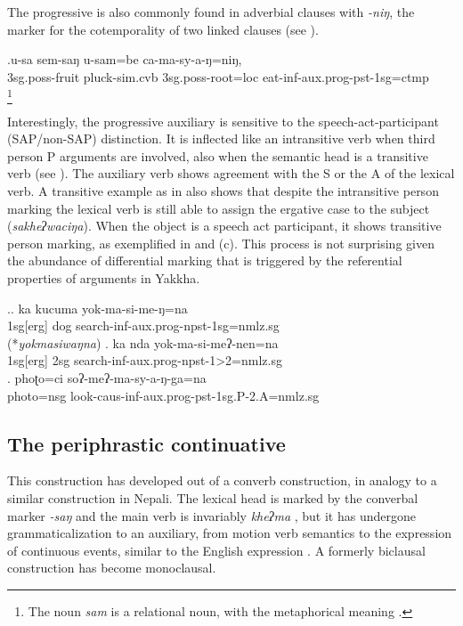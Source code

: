 The progressive is also commonly found in adverbial clauses with \emph{-niŋ}, the marker for the cotemporality of two linked clauses (see \Next). 

\exg.u-sa   sem-saŋ        u-sam=be               ca-ma-sy-a-ŋ=niŋ, \\
{\sc 3sg.poss-}fruit pluck{\sc -sim.cvb}  {\sc 3sg.poss-}root{\sc =loc} eat{\sc -inf-aux.prog-pst-1sg=ctmp}\\
\footnote{The noun \emph{sam} is a relational noun,  with the metaphorical meaning .} 

Interestingly, the progressive auxiliary is sensitive to the speech-act-participant (SAP/non-SAP) distinction. It is inflected like an intransitive verb when  third person P arguments are involved, also when the semantic head is a transitive verb (see \Next[a]). The auxiliary verb shows  agreement with the S or the A of the lexical verb. A transitive example as in \LLast[c] also shows that despite the intransitive person marking  the lexical verb is still able to assign the ergative case to the subject (\emph{sakheʔwaciŋa}).  When the object is a speech act participant, it shows transitive person marking, as exemplified in \Next[b] and (c). This process is not surprising given the abundance of differential marking that is triggered by the referential properties of arguments in Yakkha.

\ex.\ag. ka kucuma yok-ma-si-me-ŋ=na\\
	{\sc 1sg[erg]} dog search-{\sc inf-aux.prog-npst-1sg=nmlz.sg}\\
	  (*\emph{yokmasiwaŋna})
\bg. ka nda yok-ma-si-meʔ-nen=na\\
{\sc 1sg[erg]} {\sc 2sg} search-{\sc inf-aux.prog-npst-1>2=nmlz.sg}\\
\bg. phoʈo=ci soʔ-meʔ-ma-sy-a-ŋ-ga=na\\
photo{\sc =nsg} look{\sc -caus-inf-aux.prog-pst-1sg.P-2.A=nmlz.sg}\\

\subsection{The periphrastic continuative}

This construction has developed out of a converb construction, in analogy to a similar construction in Nepali. The lexical head is marked by the converbal marker \emph{-saŋ} and the  main verb is invariably \emph{kheʔma} , but it has undergone grammaticalization to an auxiliary, from motion verb semantics to the expression of continuous events, similar to the English expression . A formerly biclausal construction has become monoclausal.

